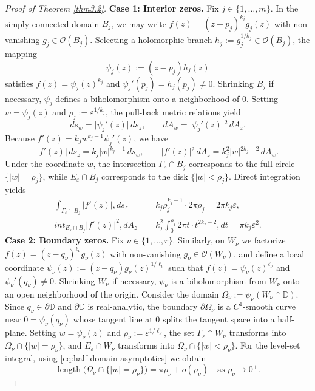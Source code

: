 \documentclass[12pt,twoside]{amsart}
\numberwithin{equation}{section}
\numberwithin{definition}{section} %
\begin{document}
\begin{proof}[Proof of Theorem \ref{thm3.2}]
\medskip
\noindent\textbf{Case 1: Interior zeros.} Fix $j \in \{1, \dots, m\}$. In the simply connected domain $B_j$, we may write $f(z) = (z - p_j)^{k_j} g_j(z)$ with non-vanishing $g_j \in \mathcal{O}(B_j)$. Selecting a holomorphic branch $h_j := g_j^{1/k_j} \in \mathcal{O}(B_j)$, the mapping$$\psi_j(z) := (z - p_j) h_j(z)$$satisfies $f(z) = \psi_j(z)^{k_j}$ and $\psi_j'(p_j) = h_j(p_j) \neq 0$. Shrinking $B_j$ if necessary, $\psi_j$ defines a biholomorphism onto a neighborhood of $0$. Setting $w = \psi_j(z)$ and $\rho_j := \varepsilon^{1/k_j}$, the pull-back metric relations yield$$ds_w = \vert{}\psi_j'(z)\vert{}\,ds_z, \qquad dA_w = \vert{}\psi_j'(z)\vert{}^2\,dA_z.$$Because $f'(z) = k_j w^{k_j - 1} \psi_j'(z)$, we have$$\vert{}f'(z)\vert{}\,ds_z = k_j \vert{}w\vert{}^{k_j-1}\,ds_w, \qquad \vert{}f'(z)\vert{}^2\,dA_z = k_j^2 \vert{}w\vert{}^{2k_j-2}\,dA_w.$$Under the coordinate $w$, the intersection $\Gamma_\varepsilon \cap B_j$ corresponds to the full circle $\{\vert{}w\vert{} = \rho_j\}$, while $E_\varepsilon \cap B_j$ corresponds to the disk $\{\vert{}w\vert{} < \rho_j\}$. Direct integration yields
\begin{equation}\label{eq:interior-zero-contributions}
\begin{aligned}\int_{\Gamma_\varepsilon \cap B_j} |f'(z)|,ds_z &= k_j \rho_j^{k_j-1} \cdot 2\pi \rho_j = 2\pi k_j \varepsilon, \\int_{E_\varepsilon \cap B_j} |f'(z)|^2,dA_z &= k_j^2 \int_0^{\rho_j} 2\pi t \cdot t^{2k_j-2},dt = \pi k_j \varepsilon^2.
\end{aligned}
\end{equation}
\medskip
\noindent\textbf{Case 2: Boundary zeros.}
Fix $\nu \in \{1, \dots, r\}$. Similarly, on $W_\nu$ we factorize $f(z) = (z - q_\nu)^{\ell_\nu} g_\nu(z)$ with non-vanishing $g_\nu \in \mathcal{O}(W_\nu)$, and define a local coordinate $\psi_\nu(z) := (z - q_\nu) g_\nu(z)^{1/\ell_\nu}$ such that $f(z) = \psi_\nu(z)^{\ell_\nu}$ and $\psi_\nu'(q_\nu) \neq 0$. Shrinking $W_\nu$ if necessary, $\psi_\nu$ is a biholomorphism from $W_\nu$ onto an open neighborhood of the origin. Consider the domain $\Omega_\nu := \psi_\nu(W_\nu \cap \mathbb{D})$. Since $q_\nu \in \partial\mathbb{D}$ and $\partial\mathbb{D}$ is real-analytic, the boundary $\partial\Omega_\nu$ is a $C^1$-smooth curve near $0 = \psi_\nu(q_\nu)$ whose tangent line at $0$ splits the tangent space into a half-plane. Setting $w = \psi_\nu(z)$ and $\rho_\nu := \varepsilon^{1/\ell_\nu}$, the set $\Gamma_\varepsilon \cap W_\nu$ transforms into $\Omega_\nu \cap \{\vert{}w\vert{} = \rho_\nu\}$, and $E_\varepsilon \cap W_\nu$ transforms into $\Omega_\nu \cap \{\vert{}w\vert{} < \rho_\nu\}$. For the level-set integral, using \eqref{eq:half-domain-asymptotics} we obtain$$\operatorname{length}\bigl( \Omega_\nu \cap \{\vert{}w\vert{} = \rho_\nu\} \bigr) = \pi \rho_\nu + o(\rho_\nu) \quad \text{as } \rho_\nu \to 0^+.$$

\end{proof}
\end{document}
